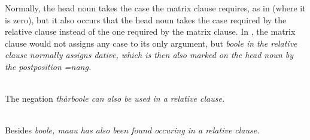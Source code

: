  

Normally, the head noun takes the case the matrix clause requires, as in  (where it is zero), but it also occurs that the head noun takes the case required by the relative clause instead of the one required by the matrix clause. In , the matrix clause would not assigns any case to its only argument, but \em boole \em in the relative clause normally assigns dative, which is then also marked on the head noun by the postposition \em =nang\em.

 \\
The negation \em thàrboole \em can also be used in a relative clause.

 \\
% 

Besides \em boole\em, \em maau \em has also been found occuring in a relative clause.




